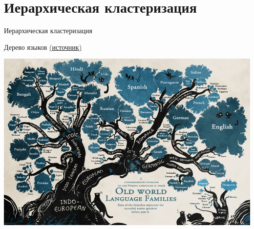 \documentclass[10pt]{beamer}
\begin{document}

\section{Иерархическая кластеризация}


\begin{frame}

\begin{center}
{\Large Иерархическая кластеризация}
\end{center}

\end{frame}

\begin{frame}{Дерево языков \href{http://mentalfloss.com/article/59665/feast-your-eyes-beautiful-linguistic-family-tree}{(источник)}}

\begin{center}
\includegraphics[width=\textwidth]{images/languages.png}
\end{center}

\end{frame}
\end{document}

